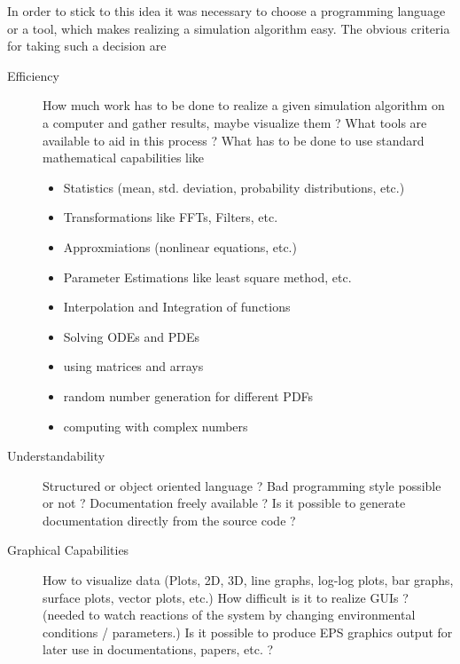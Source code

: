 In order to stick to this idea it was necessary to choose a programming 
language or a tool, which makes realizing a simulation algorithm
easy. The obvious criteria for taking such a decision are
\cite[]{GARCIA}
\begin{description}
\item[Efficiency] How much work has to be done to realize a given
        simulation algorithm on a computer and gather results, maybe
        visualize them ? \newline 
        What tools are available to aid in this process ? \newline
        What has to be done to use standard mathematical capabilities
        like 
\begin{itemize}
\item Statistics (mean, std. deviation, probability distributions, etc.)
\item Transformations like FFTs, Filters, etc.
\item Approxmiations (nonlinear equations, etc.)
\item Parameter Estimations like least square method, etc.
\item Interpolation and Integration of functions
\item Solving ODEs and PDEs
\item using matrices and arrays
\item random number generation for different PDFs
\item computing with complex numbers
\end{itemize}
\item[Understandability] Structured or object oriented language ? \newline
        Bad programming style possible or not ? \newline
        Documentation freely available ? \newline
        Is it possible to generate documentation directly from the
        source code ?
\item[Graphical Capabilities] How to visualize data (Plots, 2D, 3D, 
        line graphs, log-log plots, bar graphs, surface plots, vector 
        plots, etc.) \newline
        How difficult is it to realize GUIs ? (needed to watch reactions
        of the system by changing environmental conditions / parameters.)
        \newline
        Is it possible to produce EPS graphics output for later use
        in documentations, papers, etc. ?

\end{description}
